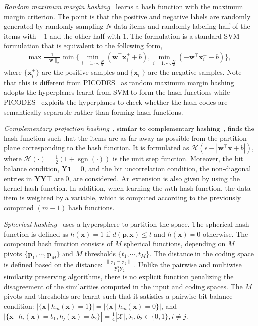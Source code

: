 \documentclass[10pt,journal,compsoc]{IEEEtran}
\begin{document}
\emph{Random maximum margin hashing}~\cite{JolyB11} learns
a hash function with the maximum margin criterion.
The point is that
the positive and negative labels
are randomly generated
by randomly sampling $N$ data items
and randomly labeling half of the items
with $-1$
and the other half with $1$.
The formulation is a standard SVM formulation
that is equivalent to the following form,
\begin{align}
\max \frac{1}{\|\mathbf{w}\|_2}
\min\{\min_{i=1,\cdots,\frac{N}{2}}(\mathbf{w}^\top\mathbf{x}_i^+ + b), \min_{i=1, \cdots, \frac{N}{2}}(-\mathbf{w}^\top\mathbf{x}_i^- - b)\},\nonumber
\end{align}
where $\{\mathbf{x}_i^+\}$ are the positive samples
and $\{\mathbf{x}_i^-\}$ are the negative samples.
Note that this is different from PICODES~\cite{BergamoTF11}
as random maximum margin hashing adopts
the hyperplanes learnt from SVM to form the hash functions
while PICODES~\cite{BergamoTF11}
exploits the hyperplanes to check
whether the hash codes are semantically separable
rather than forming hash functions.

\emph{Complementary projection hashing}~\cite{JinHLZLCL13},
similar to complementary hashing~\cite{XuWLZLY11},
finds the hash function
such that
the items are as far away as possible
from the partition plane corresponding to the hash function.
It is formulated
as
$\mathcal{H}(\epsilon - |\mathbf{w}^\top\mathbf{x} + b|)$,
where $\mathcal{H}(\cdot) = \frac{1}{2}(1+ \operatorname{sgn}(\cdot))$ is the unit step function.
Moreover, the bit balance condition,
$\mathbf{Y}\mathbf{1} = 0$,
and the bit uncorrelation condition,
the non-diagonal entries in $\mathbf{Y}\mathbf{Y}\top$ are $0$,
are considered.
An extension is also given
by using the kernel hash function.
In addition,
when learning the $m$th hash function,
the data item is weighted
by a variable,
which is computed
according to the previously computed $(m-1)$ hash functions.


\emph{Spherical hashing}~\cite{HeoLHCY12}
uses a hypersphere
to partition the space.
The spherical hash function is defined as
$h(\mathbf{x}) = 1$ if $d(\mathbf{p}, \mathbf{x}) \leqslant t$
and $h(\mathbf{x}) = 0$ otherwise.
The compound hash function
consists of $M$ spherical functions,
depending on
$M$ pivots $\{\mathbf{p}_1, \cdots, \mathbf{p}_M\}$
and $M$ thresholds $\{t_1, \cdots, t_M\}$.
The distance in the coding space is defined based on
the distance:
$\frac{\|\mathbf{y}_1 - \mathbf{y}_2\|_1}{ \mathbf{y}_1^T  \mathbf{y}_2}$.
Unlike the pairwise and multiwise similarity preserving algorithms,
there is no explicit function
penalizing the disagreement of the similarities
computed in the input and coding spaces.
The $M$ pivots and thresholds
are learnt
such that
it satisfies a pairwise bit balance condition:
$|\{\mathbf{x}~|~h_m(\mathbf{x}) = 1\}|
= |\{\mathbf{x}~|~h_m(\mathbf{x}) = 0\}|$,
and
$|\{\mathbf{x}~|~h_i(\mathbf{x}) = b_1, h_j(\mathbf{x}) = b_2\}|
= \frac{1}{4} |\mathcal{X}|, b_1, b_2 \in \{0, 1\}, i \neq j$.
\end{document}
